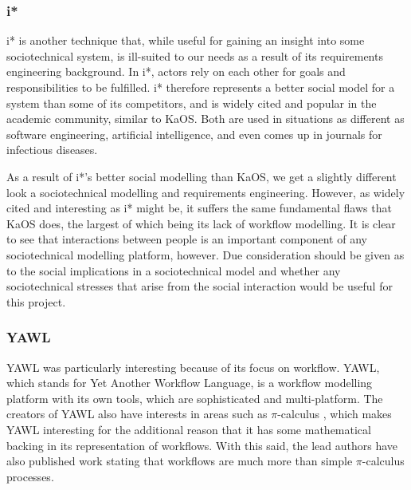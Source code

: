 \documentclass[11pt, twocolumn]{article}
\newcommand{\picalc}{\(\pi\)-calculus }
\begin{document}
\subsubsection{i*} %
\label{research_istar}
i* is another technique that, while useful for gaining an insight into some sociotechnical system, is ill-suited to our needs as a result of its requirements engineering background\cite{Werneck2009}. In i*, actors rely on each other for goals and responsibilities to be fulfilled. i* therefore represents a better social model for a system than some of its competitors, and is widely cited and popular in the academic community, similar to KaOS. Both are used in situations as different as software engineering\cite{Almisned2010}, artificial intelligence\cite{VanDiggelen2010}, and even comes up in journals for infectious diseases\cite{Tutorial2007}. \par
As a result of i*'s better social modelling than KaOS, we get a slightly different look a sociotechnical modelling and requirements engineering. However, as widely cited and interesting as i* might be, it suffers the same fundamental flaws that KaOS does, the largest of which being its lack of workflow modelling. It is clear to see that interactions between people is an important component of any sociotechnical modelling platform, however. Due consideration should be given as to the social implications in a sociotechnical model and whether any sociotechnical stresses that arise from the social interaction would be useful for this project. \par

\subsubsection{YAWL} %
YAWL was particularly interesting because of its focus on workflow. YAWL, which stands for Yet Another Workflow Language\cite{TerHofstede2010}, is a workflow modelling platform with its own tools, which are sophisticated and multi-platform. The creators of YAWL also have interests in areas such as \picalc\cite{Aalst2004}, which makes YAWL interesting for the additional reason that it has some mathematical backing in its representation of workflows. With this said, the lead authors have also published work stating that workflows are much more than simple \picalc processes\cite{Aalst2004}. \par
\end{document}
